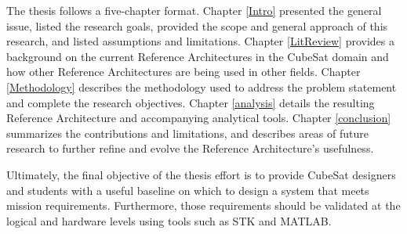 The thesis follows a five-chapter format. Chapter \ref{Intro} presented the general issue, listed the research goals, provided the scope and general approach of this research, and listed assumptions and limitations. Chapter \ref{LitReview} provides a background on the current Reference Architectures in the CubeSat domain and how other Reference Architectures are being used in other fields. Chapter \ref{Methodology} describes the methodology used to address the problem statement and complete the research objectives. Chapter \ref{analysis} details the resulting Reference Architecture and accompanying analytical tools. Chapter \ref{conclusion} summarizes the contributions and limitations, and describes areas of future research to further refine and evolve the Reference Architecture’s usefulness. 

Ultimately, the final objective of the thesis effort is to provide CubeSat designers and students with a useful baseline on which to design a system that meets mission requirements. Furthermore, those requirements should be validated at the logical and hardware levels using tools such as STK and MATLAB.